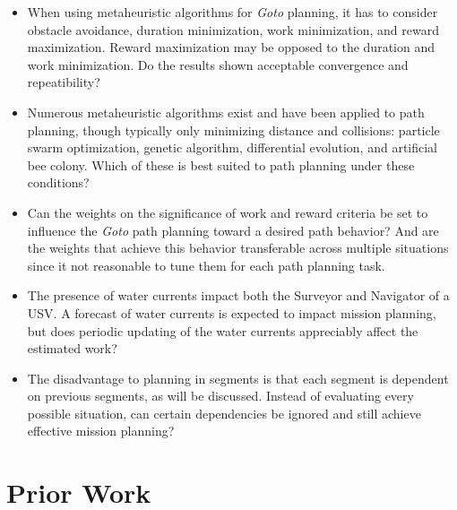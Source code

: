 \documentclass{tamuccthesis}
\begin{document}
\begin{itemize}
    \item When using metaheuristic algorithms for \textit{Goto} planning, it has to consider obstacle avoidance, duration minimization, work minimization, and reward maximization. Reward maximization may be opposed to the duration and work minimization. Do the results shown acceptable convergence and repeatibility?

    \item Numerous metaheuristic algorithms exist and have been applied to path planning, though typically only minimizing distance and collisions: particle swarm optimization, genetic algorithm, differential evolution, and artificial bee colony. Which of these is best suited to path planning under these conditions?

    \item Can the weights on the significance of work and reward criteria be set to influence the \textit{Goto} path planning toward a desired path behavior? And are the weights that achieve this behavior transferable across multiple situations since it not reasonable to tune them for each path planning task. 

    \item The presence of water currents impact both the Surveyor and Navigator of a USV. A forecast of water currents is expected to impact mission planning, but does periodic updating of the water currents appreciably affect the estimated work? 
    
    \item The disadvantage to planning in segments is that each segment is dependent on previous segments, as will be discussed. Instead of evaluating every possible situation, can certain dependencies be ignored and still achieve effective mission planning?
    
\end{itemize}

\section{Prior Work}
\end{document}
